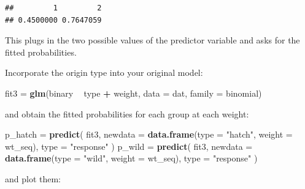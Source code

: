 \documentclass[]{book}
\newenvironment{Shaded}{\begin{snugshade}}{\end{snugshade}}
\newcommand{\DataTypeTok}[1]{\textcolor[rgb]{0.13,0.29,0.53}{#1}}
\newcommand{\DecValTok}[1]{\textcolor[rgb]{0.00,0.00,0.81}{#1}}
\newcommand{\KeywordTok}[1]{\textcolor[rgb]{0.13,0.29,0.53}{\textbf{#1}}}
\newcommand{\NormalTok}[1]{#1}
\newcommand{\OperatorTok}[1]{\textcolor[rgb]{0.81,0.36,0.00}{\textbf{#1}}}
\newcommand{\StringTok}[1]{\textcolor[rgb]{0.31,0.60,0.02}{#1}}
\begin{document}
\begin{verbatim}
##         1         2 
## 0.4500000 0.7647059
\end{verbatim}

This plugs in the two possible values of the predictor variable and asks for the fitted probabilities.

Incorporate the origin type into your original model:

\begin{Shaded}
\begin{Highlighting}[]
\NormalTok{fit3 =}\StringTok{ }\KeywordTok{glm}\NormalTok{(binary }\OperatorTok{~}\StringTok{ }\NormalTok{type }\OperatorTok{+}\StringTok{ }\NormalTok{weight, }\DataTypeTok{data =}\NormalTok{ dat, }\DataTypeTok{family =}\NormalTok{ binomial)}
\end{Highlighting}
\end{Shaded}

and obtain the fitted probabilities for each group at each weight:

\begin{Shaded}
\begin{Highlighting}[]
\NormalTok{p_hatch =}\StringTok{ }\KeywordTok{predict}\NormalTok{(}
\NormalTok{  fit3, }\DataTypeTok{newdata =} \KeywordTok{data.frame}\NormalTok{(}\DataTypeTok{type =} \StringTok{"hatch"}\NormalTok{, }\DataTypeTok{weight =}\NormalTok{ wt_seq),}
  \DataTypeTok{type =} \StringTok{"response"}
\NormalTok{)}
\NormalTok{p_wild =}\StringTok{ }\KeywordTok{predict}\NormalTok{(}
\NormalTok{  fit3, }\DataTypeTok{newdata =} \KeywordTok{data.frame}\NormalTok{(}\DataTypeTok{type =} \StringTok{"wild"}\NormalTok{, }\DataTypeTok{weight =}\NormalTok{ wt_seq),}
  \DataTypeTok{type =} \StringTok{"response"}
\NormalTok{)}
\end{Highlighting}
\end{Shaded}

and plot them:

\begin{Shaded}
\end{Shaded}
\end{document}
